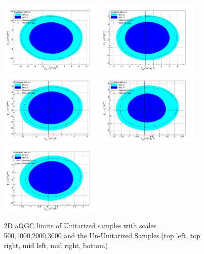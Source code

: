 \begin{figure}[h!]
\begin{center}

\includegraphics[width=0.45\textwidth]{figures/combination/Comb500-Lim.png}
\includegraphics[width=0.45\textwidth]{figures/combination/Comb100-Lim.png}\\
\includegraphics[width=0.45\textwidth]{figures/combination/Comb200-Lim.png}
\includegraphics[width=0.45\textwidth]{figures/combination/Comb300-Lim.png}\\
\includegraphics[width=0.45\textwidth]{figures/combination/CombUnit-Lim.png}
\end{center}
\caption{2D aQGC limits of Unitarized samples with scales 500,1000,2000,3000 and the Un-Unitarized Samples.(top left, top right, mid left, mid right, bottom)}
 \label{fig:Ununit-aQGC}
 \end{figure}




